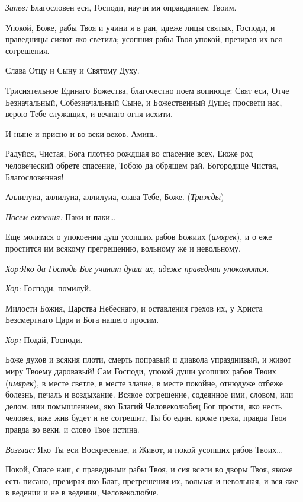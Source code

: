 \begin{mymulticols}
{\itshape Запев:} Благословен еси, Господи, научи мя оправданием Твоим. 

Упокой, Боже, рабы Твоя и учини я в раи, идеже лицы святых, Господи, и праведницы сияют яко светила; усопшия рабы Твоя упокой, презирая их вся согрешения. 

Слава Отцу и Сыну и Святому Духу. 

Трисиятельное Единаго Божества, благочестно поем вопиюще: Свят еси, Отче Безначальный, Собезначальный Сыне, и Божественный Душе; просвети нас, верою Тебе служащих, и вечнаго огня исхити. 

И ныне и присно и во веки веков. Аминь. 

Радуйся, Чистая, Бога плотию рождшая во спасение всех, Еюже род человеческий обрете спасение, Тобою да обрящем рай, Богородице Чистая, Благословенная! 

Аллилуиа, аллилуиа, аллилуиа, слава Тебе, Боже. ({\itshape Трижды}) 

{\itshape Посем ектения:} Паки и паки… 

Еще молимся о упокоении душ усопших рабов Божиих ({\itshape имярек}), и о еже простится им всякому прегрешению, вольному же и невольному. 

{\itshape Хор:Яко да Господь Бог учинит души их, идеже праведнии упокояются. 

}{\itshape Хор:} Господи, помилуй. 

Милости Божия, Царства Небеснаго, и оставления грехов их, у Христа Безсмертнаго Царя и Бога нашего просим. 

{\itshape Хор:} Подай, Господи.




Боже духов и всякия плоти, смерть поправый и диавола упразднивый, и живот миру Твоему даровавый! Сам Господи, упокой души усопших рабов Твоих ({\itshape имярек}), в месте светле, в месте злачне, в месте покойне, отнюдуже отбеже болезнь, печаль и воздыхание. Всякое согрешение, содеянное ими, словом, или делом, или помышлением, яко Благий Человеколюбец Бог прости, яко несть человек, иже жив будет и не согрешит, Ты бо един, кроме греха, правда Твоя правда во веки, и слово Твое истина. 

{\itshape Возглас:} Яко Ты еси Воскресение, и Живот, и покой усопших рабов Твоих…




Покой, Спасе наш, с праведными рабы Твоя, и сия всели во дворы Твоя, якоже есть писано, презирая яко Благ, прегрешения их, вольная и невольная, и вся яже в ведении и не в ведении, Человеколюбче. 


\end{mymulticols}
